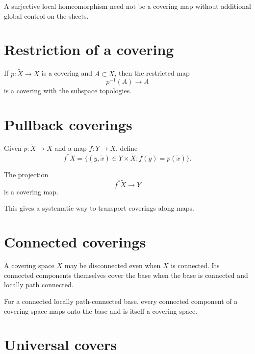 \begin{warning}
\label{warn:viii10-local-converse}
A surjective local homeomorphism need not be a covering map without additional
global control on the sheets.
\end{warning}

\section{Restriction of a covering}

\begin{proposition}[Restriction]
\label{prop:viii10-restriction}
If \(p:\widetilde X\to X\) is a covering and \(A\subset X\), then the restricted
map
\[
p^{-1}(A)\to A
\]
is a covering with the subspace topologies.
\end{proposition}

\section{Pullback coverings}

Given \(p:\widetilde X\to X\) and a map \(f:Y\to X\), define
\[
f^*\widetilde X
=
\{(y,\tilde x)\in Y\times\widetilde X:
f(y)=p(\tilde x)\}.
\]

\begin{theorem}
\label{thm:viii10-pullback}
The projection
\[
f^*\widetilde X\to Y
\]
is a covering map.
\end{theorem}

This gives a systematic way to transport coverings along maps.

\section{Connected coverings}

A covering space \(\widetilde X\) may be disconnected even when \(X\) is
connected.  Its connected components themselves cover the base when the base
is connected and locally path connected.

\begin{proposition}
\label{prop:viii10-components}
For a connected locally path-connected base, every connected component of a
covering space maps onto the base and is itself a covering space.
\end{proposition}

\section{Universal covers}

